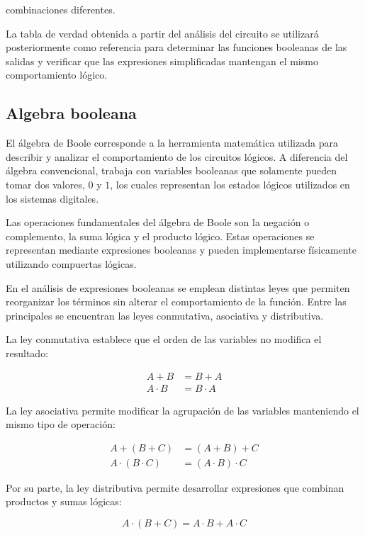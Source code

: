 \documentclass[12pt]{report}
\begin{document}
combinaciones diferentes.


La tabla de verdad obtenida a partir del análisis del circuito se utilizará posteriormente como referencia para determinar las funciones booleanas de las salidas y verificar que las expresiones simplificadas mantengan el mismo comportamiento lógico.

\subsection{Algebra booleana}


El álgebra de Boole corresponde a la herramienta matemática utilizada para describir y analizar el comportamiento de los circuitos lógicos. A diferencia del álgebra convencional, trabaja con variables booleanas que solamente pueden tomar dos valores, $0$ y $1$, los cuales representan los estados lógicos utilizados en los sistemas digitales.

Las operaciones fundamentales del álgebra de Boole son la negación o complemento, la suma lógica y el producto lógico. Estas operaciones se representan mediante expresiones booleanas y pueden implementarse físicamente utilizando compuertas lógicas.

En el análisis de expresiones booleanas se emplean distintas leyes que permiten reorganizar los términos sin alterar el comportamiento de la función. Entre las principales se encuentran las leyes conmutativa, asociativa y distributiva.

La ley conmutativa establece que el orden de las variables no modifica el resultado:


\begin{align}
    A + B &= B + A \\
    A \cdot B &= B \cdot A
\end{align}

La ley asociativa permite modificar la agrupación de las variables manteniendo
el mismo tipo de operación:

\begin{align}
    A + (B + C) &= (A + B) + C \\
    A \cdot (B \cdot C) &= (A \cdot B) \cdot C
\end{align}

Por su parte, la ley distributiva permite desarrollar expresiones que combinan
productos y sumas lógicas:

\begin{equation}
    A \cdot (B + C) = A \cdot B + A \cdot C
\end{equation}
\end{document}
